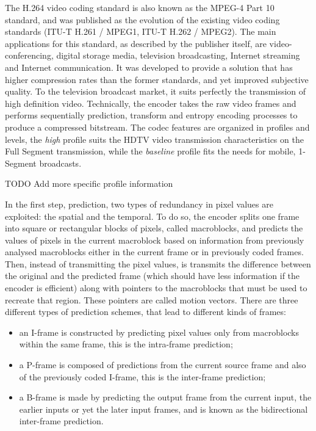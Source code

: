 \documentclass[
	12pt,				%
	openright,			%
	twoside,			%
	a4paper,			%
	brazil,
	french,				%
	english
	]{abntex2}
\begin{document}
The H.264 video coding standard is also known as the MPEG-4 Part 10 standard, and was published as the evolution of the existing video coding standards (ITU-T H.261 / MPEG1, ITU-T H.262 / MPEG2). The main applications for this standard, as described by the publisher itself, are video-conferencing, digital storage media, television broadcasting, Internet streaming and Internet communication. It was developed to provide a solution that has higher compression rates than the former standards, and yet improved subjective quality. To the television broadcast market, it suits perfectly the transmission of high definition video. Technically, the encoder takes the raw video frames and performs sequentially prediction, transform and entropy encoding processes to produce a compressed bitstream. The codec features are organized in profiles and levels, the \textit{high} profile suits the HDTV video transmission characteristics on the Full Segment transmission, while the \textit{baseline} profile fits the needs for mobile, 1-Segment broadcasts.

TODO Add more specific profile information

In the first step, prediction, two types of redundancy in pixel values are exploited: the spatial and the temporal. To do so, the encoder splits one frame into square or rectangular blocks of pixels, called macroblocks, and predicts the values of pixels in the current macroblock based on information from previously analysed macroblocks either in the current frame or in previously coded frames. Then, instead of transmitting the pixel values, is transmits the difference between the original and the predicted frame (which should have less information if the encoder is efficient) along with pointers to the macroblocks that must be used to recreate that region. These pointers are called motion vectors. There are three different types of prediction schemes, that lead to different kinds of frames:

\begin{itemize}
\item{an I-frame is constructed by predicting pixel values only from macroblocks within the same frame, this is the intra-frame prediction;}
\item{a P-frame is composed of predictions from the current source frame and also of the previously coded I-frame, this is the inter-frame prediction;}
\item{a B-frame is made by predicting the output frame from the current input, the earlier inputs or yet the later input frames, and is known as the bidirectional inter-frame prediction.}
\end{itemize}
\end{document}
